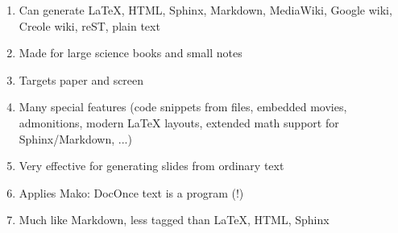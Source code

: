 \documentclass[%
oneside,                 %
final,                   %
10pt]{article}
\begin{document}
\begin{enumerate}
\item Can generate {\LaTeX}, HTML, Sphinx, Markdown, MediaWiki, Google wiki, Creole wiki, reST, plain text

\item Made for large science books and small notes

\item Targets paper and screen

\item Many special features (code snippets from files, embedded movies, admonitions, modern {\LaTeX} layouts, extended math support for Sphinx/Markdown, ...)

\item Very effective for generating slides from ordinary text

\item Applies Mako: DocOnce text is a program (!)

\item Much like Markdown, less tagged than {\LaTeX}, HTML, Sphinx
\end{enumerate}

\noindent























\end{document}
